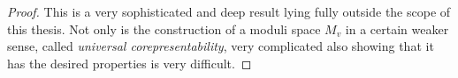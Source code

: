 \begin{proof}
    This is a very sophisticated and deep result lying fully outside the scope of this thesis. Not only is the construction of a moduli space $M_v$ in a certain weaker sense, called \emph{universal corepresentability}, very complicated also showing that it has the desired properties is very difficult. 
\end{proof}





